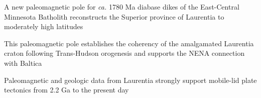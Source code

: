 \documentclass[draft]{agujournal2019}
\begin{document}








\begin{keypoints}
\item A new paleomagnetic pole for \textit{ca.} 1780 Ma diabase dikes of the East-Central Minnesota Batholith reconstructs the Superior province of Laurentia to moderately high latitudes
\item This paleomagnetic pole establishes the coherency of the amalgamated Laurentia craton following Trans-Hudson orogenesis and supports the NENA connection with Baltica
\item Paleomagnetic and geologic data from Laurentia strongly support mobile-lid plate tectonics from 2.2 Ga to the present day
\end{keypoints}

%
%
\end{document}
